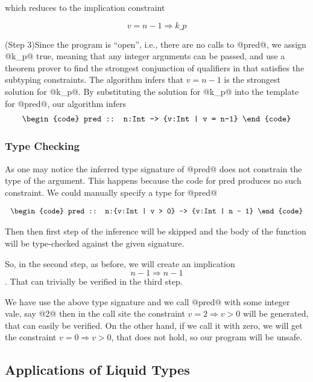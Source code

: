 which reduces to the implication constraint 

$$
v = n - 1 \Rightarrow k\_p
$$

(Step 3)Since the program is ``open'', i.e., there are no calls to @pred@,
we assign @k_p@ true, meaning that any integer arguments can be
passed, and use a theorem prover to find the strongest conjunction
of qualifiers in \qset
that satisfies the subtyping constraints. 
The algorithm
infers that $v = n-1$ is the strongest solution for @k_p@.
By substituting the solution for @k_p@ into
the template for @pred@, our algorithm infers
$$\centering
\begin{tabular}{c}
\begin{code}
pred :: n:Int -> {v:Int | v = n-1}
\end{code}
\end{tabular}
$$


\subsubsection{Type Checking}
As one may notice the inferred type signature of @pred@ does not constrain the type of the argument.
This happens because the code for pred produces no such constraint.
We could manually specify a type for @pred@

$$\centering
\begin{tabular}{c}
\begin{code}
pred :: n:{v:Int | v > 0} -> {v:Int | n - 1}
\end{code}
\end{tabular}
$$

Then then first step of the inference will be skipped and the 
body of the function will be type-checked against the given signature.

So, in the second step, as before, we will create an implication
$$n-1 \Rightarrow n - 1 $$. That can trivially be verified in the third step.

We have use the above type signature and we call @pred@ with some integer vale, say @2@
then in the call site the constraint $v = 2 \Rightarrow v >0$ will be generated, 
that can easily be verified.
%
On the other hand, if we call it with zero, we will get the constraint
$v = 0 \Rightarrow v >0$, that does not hold, 
so our program will be unsafe.

\subsection{Applications of Liquid Types}

